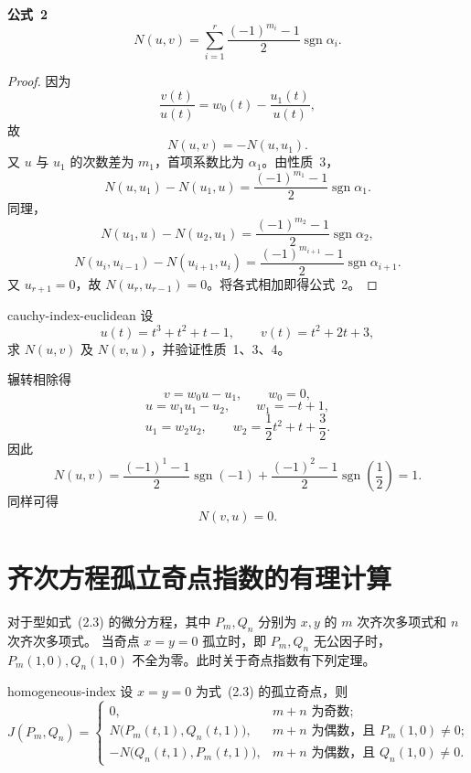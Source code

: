 \noindent\textbf{公式~2}\quad
\[
  N(u,v)=\sum_{i=1}^r
  \dfrac{(-1)^{m_i}-1}{2}\operatorname{sgn}\alpha_i.
\]

\begin{proof}
因为
\[
  \dfrac{v(t)}{u(t)}=w_0(t)-\dfrac{u_1(t)}{u(t)},
\]
故
\[
  N(u,v)=-N(u,u_1).
\]
又 $u$ 与 $u_1$ 的次数差为 $m_1$，首项系数比为 $\alpha_1$。由性质~3，
\[
  N(u,u_1)-N(u_1,u)
  =\dfrac{(-1)^{m_1}-1}{2}\operatorname{sgn}\alpha_1.
\]
同理，
\[
  N(u_1,u)-N(u_2,u_1)
  =\dfrac{(-1)^{m_2}-1}{2}\operatorname{sgn}\alpha_2,
\]
\[
  N(u_i,u_{i-1})-N(u_{i+1},u_i)
  =\dfrac{(-1)^{m_{i+1}}-1}{2}\operatorname{sgn}\alpha_{i+1}.
\]
又 $u_{r+1}=0$，故 $N(u_r,u_{r-1})=0$。将各式相加即得公式~2。
\end{proof}

\begin{example}{}{cauchy-index-euclidean}
设
\[
  u(t)=t^3+t^2+t-1,\qquad v(t)=t^2+2t+3,
\]
求 $N(u,v)$ 及 $N(v,u)$，并验证性质~1、3、4。

\begin{solution}
辗转相除得
\[
  v=w_0u-u_1,\qquad w_0=0,
\]
\[
  u=w_1u_1-u_2,\qquad w_1=-t+1,
\]
\[
  u_1=w_2u_2,\qquad
  w_2=\dfrac12t^2+t+\dfrac32.
\]
因此
\[
  N(u,v)
  =\dfrac{(-1)^1-1}{2}\operatorname{sgn}(-1)
   +\dfrac{(-1)^2-1}{2}\operatorname{sgn}\left(\dfrac12\right)
  =1.
\]
同样可得
\[
  N(v,u)=0.
\]
\end{solution}
\end{example}

\section{齐次方程孤立奇点指数的有理计算}

对于型如式~(2.3) 的微分方程，其中
$P_m,Q_n$ 分别为 $x,y$ 的 $m$ 次齐次多项式和 $n$ 次齐次多项式。
当奇点 $x=y=0$ 孤立时，即 $P_m,Q_n$ 无公因子时，
$P_m(1,0),Q_n(1,0)$ 不全为零。此时关于奇点指数有下列定理。

\begin{theorem}{}{homogeneous-index}
设 $x=y=0$ 为式~(2.3) 的孤立奇点，则
\[
J(P_m,Q_n)=
\begin{cases}
0, & m+n\text{ 为奇数};\\[4pt]
N\bigl(P_m(t,1),Q_n(t,1)\bigr),
& m+n\text{ 为偶数，且 }P_m(1,0)\ne0;\\[4pt]
-N\bigl(Q_n(t,1),P_m(t,1)\bigr),
& m+n\text{ 为偶数，且 }Q_n(1,0)\ne0.
\end{cases}
\]
\end{theorem}

